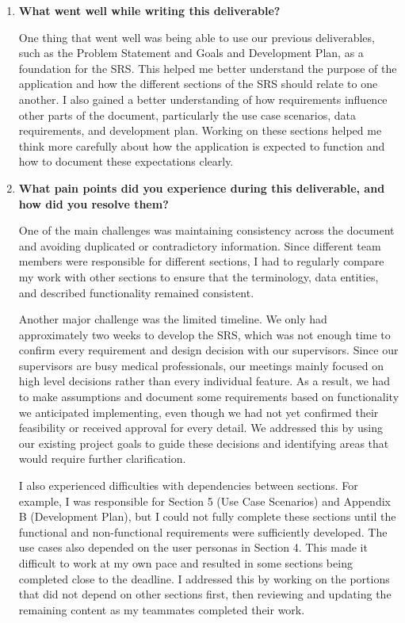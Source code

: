 \documentclass[12pt]{article}
\begin{document}
\begin{enumerate}

    \item \textbf{What went well while writing this deliverable?}

    One thing that went well was being able to use our previous
    deliverables, such as the Problem Statement and Goals and
    Development Plan, as a foundation for the SRS. This helped
    me better understand the purpose of the application and
    how the different sections of the SRS should relate to
    one another. I also gained a better understanding of how
    requirements influence other parts of the document,
    particularly the use case scenarios, data requirements,
    and development plan. Working on these sections helped
    me think more carefully about how the application is
    expected to function and how to document these
    expectations clearly.

    \item \textbf{What pain points did you experience during this
    deliverable, and how did you resolve them?}

    One of the main challenges was maintaining consistency
    across the document and avoiding duplicated or
    contradictory information. Since different team members
    were responsible for different sections, I had to
    regularly compare my work with other sections to ensure
    that the terminology, data entities, and described
    functionality remained consistent.

    Another major challenge was the limited timeline.
    We only had approximately two weeks to develop the SRS,
    which was not enough time to confirm every requirement
    and design decision with our supervisors. Since our
    supervisors are busy medical professionals, our meetings
    mainly focused on high level decisions rather than every
    individual feature. As a result, we had to make
    assumptions and document some requirements based on
    functionality we anticipated implementing, even though
    we had not yet confirmed their feasibility or received
    approval for every detail. We addressed this by using
    our existing project goals to guide these decisions
    and identifying areas that would require further
    clarification.

    I also experienced difficulties with dependencies
    between sections. For example, I was responsible for
    Section 5 (Use Case Scenarios) and Appendix B
    (Development Plan), but I could not fully complete
    these sections until the functional and non-functional
    requirements were sufficiently developed. The use
    cases also depended on the user personas in Section 4.
    This made it difficult to work at my own pace and
    resulted in some sections being completed close to
    the deadline. I addressed this by working on the
    portions that did not depend on other sections first,
    then reviewing and updating the remaining content
    as my teammates completed their work.


\end{enumerate}
\end{document}
